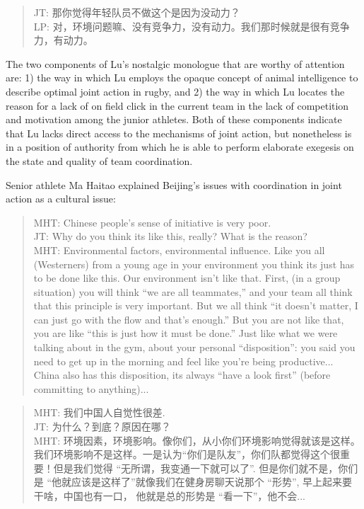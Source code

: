 \begin{CJK}{UTF8}{gbsn}
\begin{quotation}
      JT: 那你觉得年轻队员不做这个是因为没动力？\\
      LP: 对，环境问题嘛、没有竞争力，没有动力。我们那时候就是很有竞争力，有动力。
\end{quotation}

The two components of Lu's nostalgic monologue that are worthy of attention are: 1) the way in which Lu employs the opaque concept of animal intelligence to describe optimal joint action in rugby, and 2) the way in which Lu locates the reason for a lack of on field click in the current team in the lack of competition and motivation among the junior athletes.  Both of these components indicate that Lu lacks direct access to the mechanisms of joint action, but nonetheless is in a position of authority from which he is able to perform elaborate exegesis on the state and quality of team coordination.

Senior athlete Ma Haitao explained Beijing's issues with coordination in joint action as a cultural issue:

\begin{quotation}
  MHT: Chinese people's sense of initiative is very poor.\\
  JT: Why do you think its like this, really? What is the reason? \\ MHT: Environmental factors, environmental influence.  Like you all (Westerners) from a young age in your environment you think its just has to be done like this.  Our environment isn’t like that.  First, (in a group situation) you will think ``we are all teammates,'' and your team all think that this principle is very important.  But we all think ``it doesn’t matter, I can just go with the flow and that’s enough.''  But you are not like that, you are like ``this is just how it must be done.'' Just like what we were talking about in the gym, about your personal ``disposition'': you said you need to get up in the morning and feel like you're being productive... China also has this disposition, its always ``have a look first'' (before committing to anything)...
\end{quotation}

\begin{quotation}
  MHT: 我们中国人自觉性很差. \\
  JT: 为什么？到底？原因在哪？\\
  MHT: 环境因素，环境影响。像你们，从小你们环境影响觉得就该是这样。我们环境影响不是这样。一是认为``你们是队友''，你们队都觉得这个很重要！但是我们觉得 ``无所谓，我变通一下就可以了''. 但是你们就不是，你们是 ``他就应该是这样了''就像我们在健身房聊天说那个 ``形势'', 早上起来要干啥，中国也有一口， 他就是总的形势是  ``看一下''，他不会...
\end{quotation}



\end{CJK}
